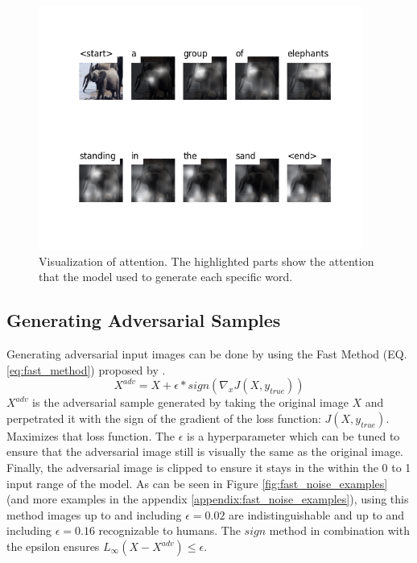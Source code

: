 \begin{figure}[h]
    \centering
    \includegraphics[width=0.95\textwidth]{figures/caption_elephant_normal.png}
    \caption{Visualization of attention. The highlighted parts show the attention that the model used to generate each specific word.}
    \label{fig:caption_elephant_clean}
\end{figure}

\subsection{Generating Adversarial Samples}
Generating adversarial input images can be done by using the Fast Method (EQ. \ref{eq:fast_method}) proposed by \citeauthor{goodfellow2015explaining}.
\begin{equation}
    X^{adv} = X + \epsilon * sign(\nabla_{x}J(X, y_{true}))
    \label{eq:fast_method}
\end{equation}
$X^{adv}$ is the adversarial sample generated by taking the original image $X$ and perpetrated it with the sign of the gradient of the loss function: $J(X, y_{true})$. Maximizes that loss function. The $\epsilon$ is a hyperparameter which can be tuned to ensure that the adversarial image still is visually the same as the original image. Finally, the adversarial image is clipped to ensure it stays in the within the 0 to 1 input range of the model. As can be seen in Figure \ref{fig:fast_noise_examples} (and more examples in the appendix \ref{appendix:fast_noise_examples}), using this method images up to and including $\epsilon=0.02$ are indistinguishable and up to and including $\epsilon=0.16$ recognizable to humans. The $sign$ method in combination with the epsilon ensures $L_{\infty}(X - X^{adv}) \leq \epsilon$.

